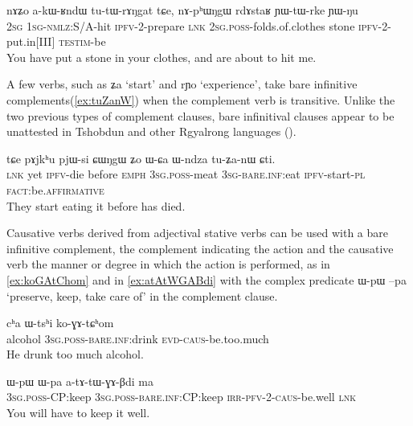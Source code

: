 \documentclass[oldfontcommands,oneside,a4paper,11pt]{article}
\newcommand{\ipa}[1]{{\phon #1}} %
\begin{document}
 \begin{exe}
\ex \label{ex:akWRndW}
\gll
\ipa{nɤʑo}  	\ipa{a-kɯ-ʁndɯ}  	\ipa{tu-tɯ-rɤŋgat}  	\ipa{tɕe,}  	\ipa{nɤ-pʰɯŋgɯ}  	\ipa{rdɤstaʁ}  	\ipa{ɲɯ-tɯ-rke}  	\ipa{ɲɯ-ŋu}  \\
\textsc{2sg} \textsc{1sg-nmlz}:S/A-hit \textsc{ipfv}-2-prepare \textsc{lnk} \textsc{2sg.poss}-folds.of.clothes stone \textsc{ipfv}-2-put.in[III] \textsc{testim}-be \\
\glt You have put a stone in your clothes, and are about to hit me.
\end{exe}

A few verbs, such as \ipa{ʑa} `start' and \ipa{rɲo} `experience', take bare infinitive complements(\ref{ex:tuZanW}) when the complement verb is transitive. Unlike the two previous types of complement clauses, bare infinitival clauses appear to be unattested in Tshobdun and other Rgyalrong languages (\citealt{sun12complementation}).

 \begin{exe}
\ex \label{ex:tuZanW}
\gll
\ipa{tɕe}  	\ipa{pɤjkʰu}  	\ipa{pjɯ-si}  	\ipa{ɕɯŋgɯ}  	\ipa{ʑo}  	\ipa{ɯ-ɕa}  	\ipa{ɯ-ndza}  	\ipa{tu-ʑa-nɯ}  	\ipa{ɕti.}  \\
\textsc{lnk} yet \textsc{ipfv}-die before \textsc{emph} \textsc{3sg.poss}-meat \textsc{3sg-bare.inf}:eat \textsc{ipfv}-start-\textsc{pl} \textsc{fact}:be.\textsc{affirmative} \\
 \glt They start eating it before has died.
\end{exe}

Causative verbs derived from adjectival stative verbs can be used with a bare infinitive complement, the complement indicating the action and the causative verb the manner or degree in which the action is performed, as in \ref{ex:koGAtChom} and in \ref{ex:atAtWGABdi} with the complex predicate \ipa{ɯ-pɯ} \ipa{--pa} `preserve, keep, take care of' in the complement clause.

 \begin{exe}
\ex \label{ex:koGAtChom}
\gll
\ipa{cʰa} \ipa{ɯ-tsʰi} \ipa{ko-ɣɤ-tɕʰom} \\
alcohol \textsc{3sg.poss}-\textsc{bare.inf}:drink \textsc{evd-caus}-be.too.much \\
\glt He drunk too much alcohol.
\end{exe}
 \begin{exe}
\ex \label{ex:atAtWGABdi}
\gll
\ipa{ɯ-pɯ}  	\ipa{ɯ-pa}  	\ipa{a-tɤ-tɯ-ɣɤ-βdi}  	\ipa{ma}  \\
\textsc{3sg.poss}-CP:keep \textsc{3sg.poss}-\textsc{bare.inf}:CP:keep \textsc{irr-pfv-2-caus}-be.well \textsc{lnk} \\
\glt You will have to keep it well.
\end{exe}
\end{document}

